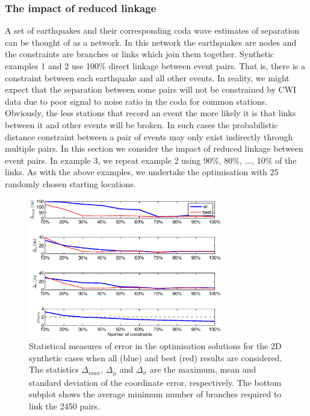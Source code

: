 \documentclass[extra]{gji}
\begin{document}
\subsubsection{The impact of reduced linkage}

A set of earthquakes and their corresponding coda wave estimates of separation can be thought of as
a network. In this network the earthquakes are nodes and the constraints are branches or links
which join them together. Synthetic examples 1 and 2 use 100\% direct linkage between event pairs. That is, there is a constraint
between each earthquake and all other events. In reality, we might expect that the separation between some
pairs will not be constrained by CWI data due to poor signal to noise ratio in the coda for common stations.
Obviously, the less stations that record an event the more likely it is that links
between it and other events will be broken.
In such cases the probabilistic distance constraint between a pair of
events may only exist indirectly through multiple pairs. In this section we
consider the impact of reduced linkage between event pairs. In example 3, we repeat example 2
using 90\%, 80\%, ..., 10\% of the links. As with the above examples, we undertake the
optimisation with 25 randomly chosen starting locations.

\begin{figure}
\noindent\includegraphics[width = 20pc]{diags/ressummary_2Dsynth50eq.eps}
\caption{Statistical measures of error in the optimisation solutions for the 2D synthetic cases when all (blue)
and best (red) results are considered. The statistics $\Delta_{max}$, $\Delta_\mu$ and
$\Delta_\sigma$ are the maximum, mean and standard deviation of the coordinate error, respectively.
The bottom subplot shows the average minimum number of branches required to link the 2450 pairs.}
 \label{fig:optimisationresults-2Dsynth}
\end{figure}
\end{document}
